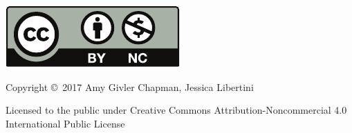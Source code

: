 \noindent\hskip -1in\begin{minipage}{2in}
\includegraphics{text/by-nc} 
\end{minipage}
\begin{minipage}{3in}
\noindent Copyright \copyright\ 2017 Amy Givler Chapman, Jessica Libertini

Licensed to the public under Creative Commons Attribution-Noncommercial 4.0 International Public License
\end{minipage}

